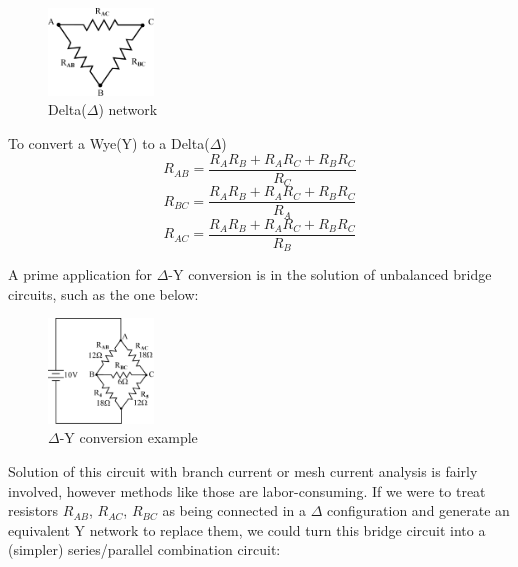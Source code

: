 \documentclass[a4 paper]{article}
\numberwithin{equation}{section}
\newcommand{\0}{\mathbf{0}}
\begin{document}
\begin{paracol}{2}
\begin{rightcolumn}
\begin{figure}[!ht]
  \caption{Delta($\Delta$) network}
  \centering
  \includegraphics[width=0.25\textwidth]{./images/equ_resis2}
\end{figure}
\vspace{0.5 cm}
\hspace{1.5 cm}To convert a Wye(Y) to a Delta($\Delta$)
\begin{equation}
R_{AB} = \frac{R_AR_B + R_AR_C + R_BR_C}{R_C}
\end{equation}
\begin{equation}
R_{BC} = \frac{R_AR_B + R_AR_C + R_BR_C}{R_A}
\end{equation}
\begin{equation}
R_{AC} = \frac{R_AR_B + R_AR_C + R_BR_C}{R_B}
\end{equation}
\end{rightcolumn}
\end{paracol}


A prime application for $\Delta$-Y conversion is in the solution of unbalanced bridge circuits, such as the one below:

\begin{figure}[!ht]
  \caption{$\Delta$-Y conversion example}
  \centering
  \includegraphics[width=0.25\textwidth,height=0.17\textheight]{./images/equ_resis3}
\end{figure}

Solution of this circuit with branch current or mesh current analysis is fairly involved, however methods like those are labor-consuming. If we were to treat resistors $R_{AB}$, $R_{AC}$, $R_{BC}$ as being connected in a $\Delta$ configuration and generate an equivalent Y network to replace them, we could turn this bridge circuit into a (simpler) series/parallel combination circuit:
\end{document}
